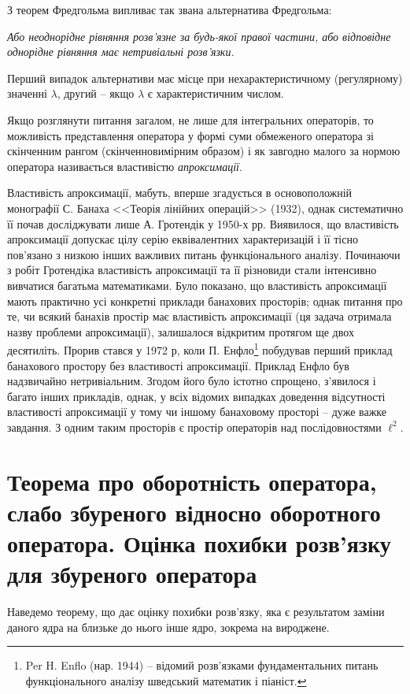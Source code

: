 \documentclass[14pt,twoside]{extreport}
\theoremstyle{mystyle}
\numberwithin{equation}{chapter}
\begin{document}
З теорем Фредгольма випливає так звана альтернатива Фредгольма:

\emph{Або неоднорідне рівняння розв'язне за будь-якої правої частини, або відповідне однорідне рівняння має нетривіальні розв'язки.}

Перший випадок альтернативи має місце при нехарактеристичному (регулярному) значенні $\lambda$, другий -- якщо $\lambda$ є характеристичним числом.

Якщо розглянути питання загалом, не лише для інтегральних операторів, то можливість представлення оператора у формі суми обмеженого оператора зі скінченним рангом (скінченновимірним образом) і як завгодно малого за нормою оператора називається властивістю \emph{апроксимації}.

Властивість апроксимації, мабуть, вперше згадується в основоположній монографії С. Банаха <<Теорія лінійних операцій>> (1932), однак систематично її почав досліджувати лише А. Гротендік у 1950-х рр. Виявилося, що властивість апроксимації допускає цілу серію еквівалентних характеризацій і її тісно пов'язано з низкою інших важливих питань функціонального аналізу. Починаючи з робіт Гротендіка властивість апроксимації та її різновиди стали інтенсивно вивчатися багатьма математиками. Було показано, що властивість апроксимації мають практично усі конкретні приклади банахових просторів; однак питання про те, чи всякий банахів простір має властивість апроксимації (ця задача отримала назву проблеми апроксимації), залишалося відкритим протягом ще двох десятиліть. Прорив стався у 1972 р, коли П. Енфло\footnote{Per H. Enflo (нар. 1944) -- відомий розв'язками фундаментальних питань функціонального аналізу шведський математик і піаніст.} побудував перший приклад банахового простору без властивості апроксимації. Приклад 
Енфло був надзвичайно нетривіальним. Згодом його було істотно спрощено, з'явилося і багато інших прикладів, однак, у всіх відомих випадках доведення відсутності властивості апроксимації у тому чи іншому банаховому просторі -- дуже важке завдання. З одним таким просторів є простір операторів над послідовностями $\ell^2$.

\section{Теорема про оборотність оператора, слабо збуреного відносно оборотного оператора. Оцінка похибки розв'язку для збуреного оператора}\label{turbulence}

Наведемо теорему, що дає оцінку похибки розв'язку, яка є результатом заміни даного ядра на близьке до нього інше ядро, зокрема на вироджене.
\end{document}
